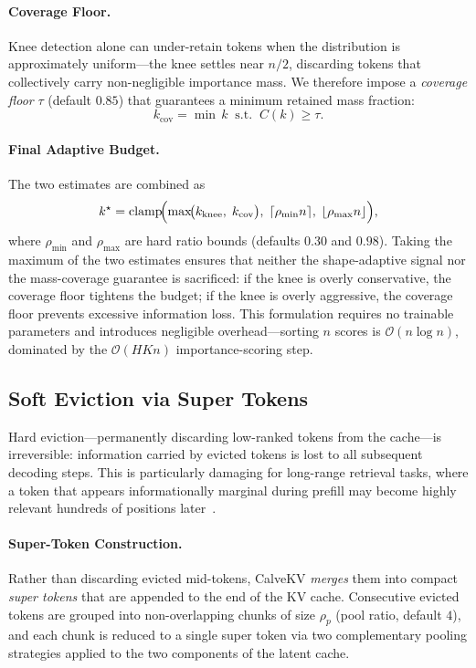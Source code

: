 \documentclass[letterpaper]{article} %
\begin{document}
\paragraph{Coverage Floor.}
Knee detection alone can under-retain tokens when the distribution is
approximately uniform---the knee settles near $n/2$, discarding tokens that
collectively carry non-negligible importance mass. We therefore impose a
\emph{coverage floor} $\tau$ (default $0.85$) that guarantees a minimum
retained mass fraction:
\begin{equation}
  k_{\mathrm{cov}}
  = \min\, k \;\;\text{s.t.}\;\; C(k) \geq \tau.
  \label{eq:cov}
\end{equation}

\paragraph{Final Adaptive Budget.}
The two estimates are combined as
\begin{equation}
  k^{\star}
  = \operatorname{clamp}\!\Bigl(
      \max\!\bigl(k_{\mathrm{knee}},\;k_{\mathrm{cov}}\bigr),\;
      \lceil\rho_{\min} n\rceil,\;
      \lfloor\rho_{\max} n\rfloor
    \Bigr),
  \label{eq:budget}
\end{equation}
where $\rho_{\min}$ and $\rho_{\max}$ are hard ratio bounds
(defaults $0.30$ and $0.98$).
Taking the maximum of the two estimates ensures that neither the
shape-adaptive signal nor the mass-coverage guarantee is sacrificed:
if the knee is overly conservative, the coverage floor tightens the budget;
if the knee is overly aggressive, the coverage floor prevents excessive
information loss.
This formulation requires no trainable parameters and introduces negligible
overhead---sorting $n$ scores is $\mathcal{O}(n\log n)$, dominated by the
$\mathcal{O}(HKn)$ importance-scoring step.

\subsection{Soft Eviction via Super Tokens}

Hard eviction---permanently discarding low-ranked tokens from the cache---is
irreversible: information carried by evicted tokens is lost to all subsequent
decoding steps. This is particularly damaging for long-range retrieval tasks,
where a token that appears informationally marginal during prefill may become
highly relevant hundreds of positions later~\cite{xiao2024streamingllm}.

\paragraph{Super-Token Construction.}
Rather than discarding evicted mid-tokens, CalveKV \emph{merges} them into
compact \emph{super tokens} that are appended to the end of the KV cache.
Consecutive evicted tokens are grouped into non-overlapping chunks of size
$\rho_p$ (pool ratio, default $4$), and each chunk is reduced to a single
super token via two complementary pooling strategies applied to the two
components of the latent cache.
\end{document}
